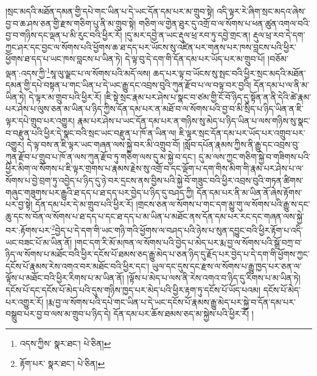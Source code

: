 །སྲང་མདའི་མཐོན་དམན་གྱི་དཔེ་གང་ཡིན་པ་དེ་ཡང་དོན་དམ་པར་མ་གྲུབ་སྟེ། འདི་ལྟར་རེ་ཞིག་སྲང་མདའ་ཞེས་བྱ་བ་ཆ་ཤས་ཅན་གྱི་རྫས་གཅིག་པུ་ནི་མ་གྲུབ་སྟེ། གཅིག་ལ་གྱེན་ཐུར་དུ་འགྲོ་བ་ལ་སོགས་པ་ཕན་ཚུན་འགལ་བའི་བྱ་བ་གཉིས་དང་ལྡན་པ་མི་རུང་བའི་ཕྱིར་རོ། །དུ་མར་དབྱེ་ན་ཡང་རྡུལ་ཕྲ་རབ་ཏུ་དབྱེ་གྲང་ན། རྡུལ་ཕྲ་རབ་དེ་དག་ཀྱང་ཤར་དང་བྱང་ལ་སོགས་པའི་ཕྱོགས་ཆ་ཐ་དད་པར་ཡོངས་སུ་འཛིན་པར་གནས་པར་ཁས་བླངས་པའི་ཕྱིར་ཕྱོགས་ཐ་དད་པ་ཡང་ཁས་བླངས་པ་ཡིན་ཏེ། དེ་ལྟ་བུ་དེ་དག་གི་དོན་དམ་པར་ཡོད་པར་མ་གྲུབ་པོ། །བཅོམ་ལྡན་:འདས་ཀྱི་\footnote{འདས་ཀྱིས་  སྣར་ཐང་།  པེ་ཅིན། }སཱ་ལུ་ལྗང་པ་ལ་སོགས་པའི་མདོ་ལས། ཆད་པར་ལྟ་བ་ཡོངས་སུ་སྤང་བའི་ཕྱིར་སྲང་མདའི་མཐོན་དམན་གྱི་དཔེ་བསྟན་པ་གང་ཡིན་པ་དེ་ཡང་རྒྱུ་དང་འབྲས་བུའི་ཀུན་རྫོབ་པ་ལ་བལྟ་བར་བྱའི། དོན་དམ་པ་ལ་ནི་མ་ཡིན་ཏེ། དེ་ལྟར་མ་གྲུབ་པའི་ཕྱིར་རོ། །ཇི་སྟེ་སྲང་རྣམ་པར་ཤེས་པ་སྣང་བ་ཙམ་གྱི་ངོ་བོ་ཉིད་དུ་སྟོན་ན་ནི་དེའི་ཚེ་རྣམ་པར་ཤེས་པ་ལུས་ཅན་མ་ཡིན་པ་ཉིད་ཀྱིས་དོན་དམ་པར་ན་མཐོ་བ་ལ་སོགས་པའི་བྱ་བ་མི་སྲིད་པ་ཉིད་ཡིན་ན་ཇི་ལྟར་དཔེ་གྲུབ་པར་འགྱུར། རྣམ་པར་ཤེས་པ་ཡང་དོན་དམ་པར་ན་གཉིས་སུ་མེད་པ་ཉིད་ཡིན་པ་ལས་གཉིས་སུ་སྣང་བ་བརྫུན་པའི་ཕྱིར་དེ་སྣང་བའི་སྲང་ཡང་བརྫུན་པ་ཁོ་ན་ཡིན་ལ། ཇི་ལྟར་སྲང་དོན་དམ་པར་ཡོད་པར་འགྲུབ་པར་འགྱུར། དེ་ལྟ་བས་ན་ཇི་ལྟར་ཡང་གཞན་ལས་སྐྱེ་བར་མི་འགྲུབ་བོ། །སློབ་དཔོན་རྣམས་ཀྱིས་ནི་རྒྱུ་དང་འབྲས་བུ་ཀུན་རྫོབ་པ་གྲུབ་པ་ཁོ་ན་ལས་ཀུན་རྫོབ་ཏུ་གཅིག་ལས་དུ་མ་སྐྱེ་བ་དང་། དུ་མ་ལས་ཀྱང་གཅིག་སྐྱེ་བ་གཟིགས་པའི་ཕྱིར་མིག་ལ་སོགས་པ་ཇི་ལྟར་གྲགས་པ་རྣམས་རྗེས་སུ་འགྲོ་བ་དང་ལྡོག་པ་དག་གིས་མིག་གི་རྣམ་པར་ཤེས་པ་ལ་སོགས་པ་བྱེ་བྲག་ཏུ་འབྱེད་པ་ཉིད་དུ་ཉེ་བར་དྲངས་ནས་བྱིས་པའི་སྐྱེ་བོ་གཟུང་བའི་ཕྱིར་འབྲས་བུའི་གཏན་ཚིགས་གཞུང་གཟུགས་པར་རྒྱུའི་ཐ་དད་པ་ཐ་དད་པར་བྱེད་པ་ཉིད་དུ་བཤད་ཀྱི། དོན་དམ་པར་ནི་མ་ཡིན་ནོ་ཞེས་རྟོགས་པར་བྱ་སྟེ། དོན་དམ་པར་དེ་མ་གྲུབ་པའི་ཕྱིར་རོ། །གྲངས་ཅན་ལ་སོགས་པ་གང་དག་མྱུ་གུ་ལ་སོགས་པའི་རྒྱུ་ས་དང་ཆུ་དང་ས་བོན་ལ་སོགས་པ་ཐ་དད་པ་དང་ཐ་དད་པ་མ་ཡིན་པ་མཐོང་ནས་དོན་དམ་པར་རང་དང་གཞན་ལས་སྐྱེ་བར་:རྟོགས་པར་\footnote{རྟོག་པར་  སྣར་ཐང་།  པེ་ཅིན། }བྱེད་པ་དེ་དག་གི་ཡང་གཉི་གའི་ཕྱོགས་ལ་བཤད་པའི་ཉེས་པ་སུན་དབྱུང་བའི་ཕྱིར་རྟོག་པ་འདི་ཡང་བཟང་པོ་མ་ཡིན་ནོ། །གང་དག་རི་མོ་མཁན་ལ་སོགས་པའི་བྱེད་པ་མེད་པར་རྨ་བྱ་ལ་སོགས་པའི་སྒྲོ་བཀྲ་བ་ཉིད་ལ་སོགས་པ་མཐོང་བའི་ཕྱིར་དངོས་པོ་ཐམས་ཅད་རྒྱུ་མེད་པ་ཅན་ཉིད་དུ་རྗོད་པར་བྱེད་པ་དེ་དག་གི་ཕྱོགས་ཀྱང་དངོས་པོ་རྣམས་རེས་འགའ་བར་མཐོང་བའི་ཕྱིར་དང་། ཡུལ་དང་དུས་དང་རྫས་ལ་སོགས་པ་རྒྱུ་ཁྱད་པར་ཅན་ལ་ལྟོས་པ་མཐོང་བའི་ཕྱིར་རིགས་པ་མ་ཡིན་ནོ། །ལྟོས་པ་མེད་པ་ལས་ནི་རེས་འགའ་བ་ཉིད་དུ་རིགས་པ་མ་ཡིན་ཏེ། དངོས་པོ་དང་དངོས་པོ་མེད་པའི་དུས་གཉིས་ཁྱད་པར་མེད་པའི་ཕྱིར་རྟག་ཏུ་དངོས་པོ་ཡོད་པའམ། དངོས་པོ་མེད་པར་འགྱུར་རོ། །རྨ་བྱ་ལ་སོགས་པའི་དཔེ་གང་ཡིན་པ་དེ་ཡང་དངོས་པོ་རྣམས་རྒྱུ་མེད་པར་སྐྱེ་བ་དོན་དམ་པར་བསྒྲུབ་པར་བྱ་བ་ལས་མ་གྲུབ་པ་ཉིད་དེ། དོན་དམ་པར་ཆོས་ཐམས་ཅད་མ་སྐྱེས་པའི་ཕྱིར་རོ། །
